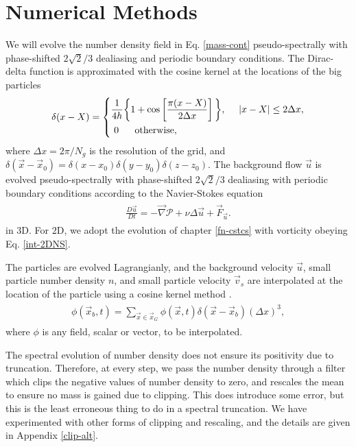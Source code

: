 \documentclass[../Rajarshi-thesis-draft.tex]{subfiles}
\begin{document}
\section{Numerical Methods}\label{lck-num-meth}
We will evolve the number density field in Eq. \eqref{mass-cont} pseudo-spectrally with phase-shifted $2\sqrt{2}/3$ dealiasing \cite{patterson1971} and periodic boundary conditions. The Dirac-delta function is approximated with the cosine kernel at the locations of the big particles \cite{peskin2002} 
\begin{align}
\label{delta}
\begin{split}
    \delta(x-X) =\begin{dcases}
        \frac{1}{4h}\bigg\{1+\cos\left[\frac{\pi (x - X)}{2\Delta x}\right]\bigg\}, \ \ \ \ |x-X| \leq 2\Delta x,\\
        \   0 \ \ \ \ \ \text{otherwise},
        \end{dcases}
\end{split}
\end{align}
where $\Delta x = 2\pi/N_g$ is the resolution of the grid, and $\delta(\vec{x} - \vec{x}_0) = \delta(x - x_0)\delta(y - y_0)\delta(z - z_0)$. The background flow $\vec{u}$ is evolved pseudo-spectrally with phase-shifted $2\sqrt{2}/3$ dealiasing with periodic boundary conditions according to the Navier-Stokes equation
\begin{align}
\begin{split}
    \frac{D \vec{u}}{Dt} = -\vec{\nabla}\mathcal{P} + \nu \Delta \vec{u} + \vec{F}_{\vec{u}}.
\end{split}
\end{align}
in $3$D. For $2$D, we adopt the evolution of chapter \ref{fn-cstcs} with vorticity obeying Eq. \eqref{int-2DNS}. 

The particles are evolved Lagrangianly, and the background velocity $\vec{u}$, small particle number density $n$, and small particle velocity $\vec{v}_s$ are interpolated at the location of the particle using a cosine kernel method \cite{pandey2019}.
\begin{align}
\begin{split}
    \phi(\vec{x}_b,t) = \sum\limits_{\vec{x}\in \vec{x}_G}^{} \phi(\vec{x},t) \delta(\vec{x} - \vec{x}_b) (\Delta x)^3,
\end{split}
\end{align}
where $\phi$ is any field, scalar or vector, to be interpolated. 

The spectral evolution of number density does not ensure its positivity due to truncation. Therefore, at every step, we pass the number density through a filter which clips the negative values of number density to zero, and rescales the mean to ensure no mass is gained due to clipping. This does introduce some error, but this is the least erroneous thing to do in a spectral truncation. We have experimented with other forms of clipping and rescaling, and the details are given in Appendix \ref{clip-alt}.
\end{document}
